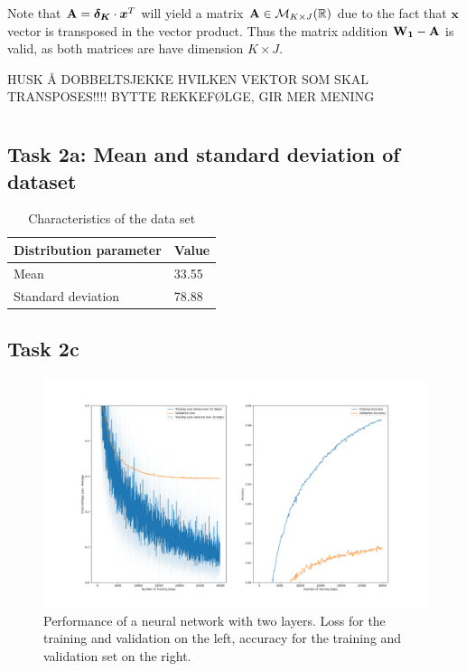 \documentclass{article}
\begin{document}
    Note that $\text{\textbf{A}} = \boldsymbol{\delta_K} \cdot \boldsymbol{x}^T$ will yield a matrix $\text{\textbf{A}} \in \mathcal{M}_{K \times J}(\mathbb{R})$ due to the fact that $\boldsymbol{x}$ vector is transposed in the vector product. Thus the matrix addition $\text{\textbf{W}}_\textbf{1} - \text{\textbf{A}}$ is valid, as both matrices are have dimension $K \times J$.  

HUSK Å DOBBELTSJEKKE HVILKEN VEKTOR SOM SKAL TRANSPOSES!!!!
BYTTE REKKEFØLGE, GIR MER MENING
\section{}
\subsection{Task 2a: Mean and standard deviation of dataset }
\begin{table}[h]
\centering
\label{tab:my-table}
\begin{tabular}{|l|l|}
\hline
\textbf{Distribution parameter} & \textbf{Value} \\ \hline
Mean                            & 33.55          \\ \hline
Standard deviation              & 78.88          \\ \hline
\end{tabular}
\caption{Characteristics of the data set}
\end{table}
\subsection{Task 2c}

\begin{figure}[H]
    \centering
    \includegraphics[width=\textwidth]{Assignments/Assignment_2/plots/task2abc/task2c_train_loss.png}
    \caption{Performance of a neural network with two layers. Loss for the training and validation on the left, accuracy for the training and validation set on the right.}
    \label{fig:task2}
\end{figure}
\end{document}
